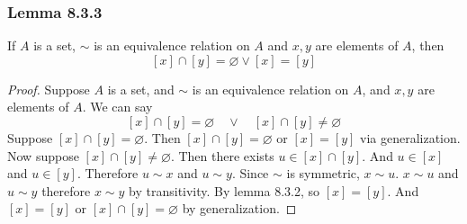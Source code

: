 \documentclass[12pt]{book}
\begin{document}
\subsubsection{Lemma 8.3.3}
If $A$ is a set, $\sim$ is an equivalence relation on $A$ and $x,y$ are elements of $A$, then 
\[
[x] \cap [y] = \varnothing \vee [x] = [y]
\]
\begin{proof}
    Suppose $A$ is a set, and $\sim$ is an equivalence relation on $A$, and $x,y$ are elements of $A$. We can say
    \[
    [x]\cap [y] = \varnothing \quad \vee \quad [x]\cap [y] \neq \varnothing
    \]
    Suppose $[x]\cap [y] = \varnothing$. Then $[x]\cap [y] = \varnothing$ or $[x]=[y]$ via generalization. Now suppose $[x]\cap [y] \neq \varnothing$. Then there exists $u \in [x]\cap [y]$. And $u \in [x]$ and $u \in [y]$. Therefore $u \sim x$ and $u \sim y$. Since $\sim$ is symmetric, $x\sim u$. $x\sim u$ and $u \sim y$ therefore $x \sim y$ by transitivity. By lemma 8.3.2, so $[x] = [y]$. And $[x] = [y]$ or $[x] \cap [y] = \varnothing$ by generalization. 
\end{proof}
\end{document}
